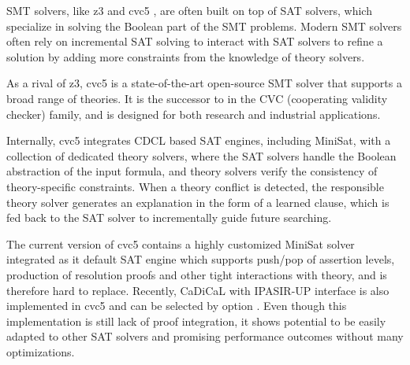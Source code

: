 SMT solvers, like z3 \cite{10.1007/978-3-540-78800-3_24} and cvc5 \cite{10.1007/978-3-030-99524-9_24}, are often built on top of SAT solvers, which specialize in solving the Boolean part of the SMT problems. Modern SMT solvers often rely on incremental SAT solving to interact with SAT solvers to refine a solution by adding more constraints from the knowledge of theory solvers.

As a rival of z3, cvc5 is a state-of-the-art open-source SMT solver that supports a broad range of theories. It is the successor to  in the CVC (cooperating validity checker) family, and is designed for both research and industrial applications.

Internally, cvc5 integrates CDCL based SAT engines, including MiniSat, with a collection of dedicated theory solvers, where the SAT solvers handle the Boolean abstraction of the input formula, and theory solvers verify the consistency of theory-specific constraints. When a theory conflict is detected, the responsible theory solver generates an explanation in the form of a learned clause, which is fed back to the SAT solver to incrementally guide future searching.

The current version of cvc5 contains a highly customized MiniSat solver integrated as it default SAT engine which supports push/pop of assertion levels, production of resolution proofs and other tight interactions with theory, and is therefore hard to replace. Recently, CaDiCaL with IPASIR-UP interface is also implemented in cvc5 and can be selected by option . Even though this implementation is still lack of proof integration, it shows potential to be easily adapted to other SAT solvers and promising performance outcomes without many optimizations.
